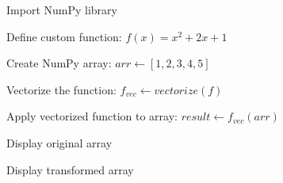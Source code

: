 \begin{algorithm}
\caption{Apply a Custom Function to a NumPy Array using Vectorization}
\begin{algorithmic}[1]

\STATE Import NumPy library

\STATE Define custom function:
\STATE $f(x) = x^2 + 2x + 1$

\STATE Create NumPy array:
\STATE $arr \gets [1, 2, 3, 4, 5]$

\STATE Vectorize the function:
\STATE $f_{vec} \gets vectorize(f)$

\STATE Apply vectorized function to array:
\STATE $result \gets f_{vec}(arr)$

\STATE Display original array

\STATE Display transformed array

\end{algorithmic}
\end{algorithm}